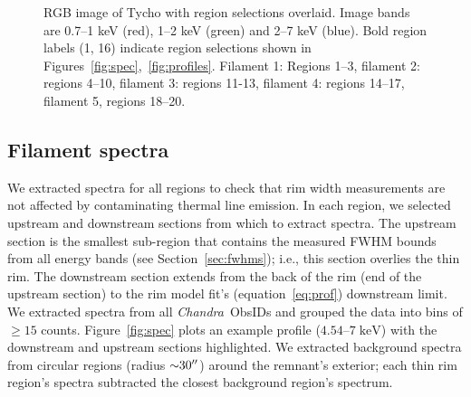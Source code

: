 \documentclass[iop, apj, numberedappendix]{emulateapj}
\newcommand*{\mt}{\mathrm}
\newcommand*{\unit}[1]{\;\mt{#1}}  %
\newcommand*{\abt}{\mathord{\sim}} %
\newcommand*{\Chandra}{\textit{Chandra}\ }
\begin{document}
\begin{figure}
    \centering
    \iftoggle{manuscript}{
        \texttt{[image: figures/f0-snr-inv.png]}
    }{
        \plotone{figures/f0-snr-inv.png}
    }
    \caption{RGB image of Tycho with region selections overlaid.  Image bands
    are 0.7--1 keV (red), 1--2 keV (green) and 2--7 keV (blue).  Bold region
    labels (1, 16) indicate region selections shown in
    Figures~\ref{fig:spec},~\ref{fig:profiles}.  Filament 1: Regions 1--3,
    filament 2: regions 4--10, filament 3: regions 11-13, filament 4:
    regions 14--17, filament 5, regions 18--20.
    \label{fig:snr}}
\end{figure}

\subsection{Filament spectra}
\label{sec:spec}

We extracted spectra for all regions to check that rim width measurements are
not affected by contaminating thermal line emission.  In each region, we
selected upstream and downstream sections from which to extract spectra.  The
upstream section is the smallest sub-region that contains the measured FWHM
bounds from all energy bands (see Section~\ref{sec:fwhms}); i.e., this section
overlies the thin rim.  The downstream section extends from the back of the rim
(end of the upstream section) to the rim model fit's (equation~\eqref{eq:prof})
downstream limit.  We extracted spectra from all \Chandra ObsIDs and grouped
the data into bins of $\geq 15$ counts.  Figure~\ref{fig:spec} plots an example
profile ($4.54$--$7 \unit{keV}$) with the downstream and upstream sections
highlighted.  We extracted background spectra from circular regions (radius
$\abt 30\arcsec$) around the remnant's exterior; each thin rim region's spectra
subtracted the closest background region's spectrum.

\begin{figure*}
    \iftoggle{manuscript}{
        \epsscale{0.7}
    }{}
     \\
    \caption{Spectra and fits from Regions 1 (top) and 16 (bottom) show varying
    rim morphology and example of rim where 0.7--1 keV peak could not be fit.
    Left: $4.5$--$7 \unit{keV}$ profile with highlighted downstream (blue) and
    upstream (grey) sections.  Intensity in arbitrary units (a.u.).  Middle:
    downstream spectrum with absorbed power law fit; Si and S lines at $1.85$,
    $2.45 \unit{keV}$ are clearly visible.  Right: upstream spectrum with
    absorbed power law fit shows that each region is likely free of thermal
    line
emission.}
    \label{fig:spec}
\end{figure*}
\end{document}
